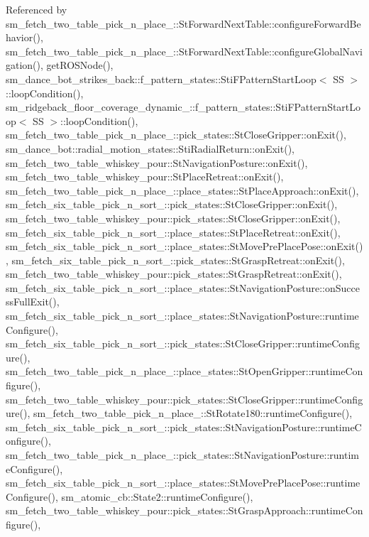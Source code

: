 Referenced by sm\+\_\+fetch\+\_\+two\+\_\+table\+\_\+pick\+\_\+n\+\_\+place\+\_\+::\+St\+Forward\+Next\+Table\+::configure\+Forward\+Behavior(), sm\+\_\+fetch\+\_\+two\+\_\+table\+\_\+pick\+\_\+n\+\_\+place\+\_\+::\+St\+Forward\+Next\+Table\+::configure\+Global\+Navigation(), get\+R\+O\+S\+Node(), sm\+\_\+dance\+\_\+bot\+\_\+strikes\+\_\+back\+::f\+\_\+pattern\+\_\+states\+::\+Sti\+F\+Pattern\+Start\+Loop$<$ S\+S $>$\+::loop\+Condition(), sm\+\_\+ridgeback\+\_\+floor\+\_\+coverage\+\_\+dynamic\+\_\+::f\+\_\+pattern\+\_\+states\+::\+Sti\+F\+Pattern\+Start\+Loop$<$ S\+S $>$\+::loop\+Condition(), sm\+\_\+fetch\+\_\+two\+\_\+table\+\_\+pick\+\_\+n\+\_\+place\+\_\+::pick\+\_\+states\+::\+St\+Close\+Gripper\+::on\+Exit(), sm\+\_\+dance\+\_\+bot\+::radial\+\_\+motion\+\_\+states\+::\+Sti\+Radial\+Return\+::on\+Exit(), sm\+\_\+fetch\+\_\+two\+\_\+table\+\_\+whiskey\+\_\+pour\+::\+St\+Navigation\+Posture\+::on\+Exit(), sm\+\_\+fetch\+\_\+two\+\_\+table\+\_\+whiskey\+\_\+pour\+::\+St\+Place\+Retreat\+::on\+Exit(), sm\+\_\+fetch\+\_\+two\+\_\+table\+\_\+pick\+\_\+n\+\_\+place\+\_\+::place\+\_\+states\+::\+St\+Place\+Approach\+::on\+Exit(), sm\+\_\+fetch\+\_\+six\+\_\+table\+\_\+pick\+\_\+n\+\_\+sort\+\_\+::pick\+\_\+states\+::\+St\+Close\+Gripper\+::on\+Exit(), sm\+\_\+fetch\+\_\+two\+\_\+table\+\_\+whiskey\+\_\+pour\+::pick\+\_\+states\+::\+St\+Close\+Gripper\+::on\+Exit(), sm\+\_\+fetch\+\_\+six\+\_\+table\+\_\+pick\+\_\+n\+\_\+sort\+\_\+::place\+\_\+states\+::\+St\+Place\+Retreat\+::on\+Exit(), sm\+\_\+fetch\+\_\+six\+\_\+table\+\_\+pick\+\_\+n\+\_\+sort\+\_\+::place\+\_\+states\+::\+St\+Move\+Pre\+Place\+Pose\+::on\+Exit(), sm\+\_\+fetch\+\_\+six\+\_\+table\+\_\+pick\+\_\+n\+\_\+sort\+\_\+::pick\+\_\+states\+::\+St\+Grasp\+Retreat\+::on\+Exit(), sm\+\_\+fetch\+\_\+two\+\_\+table\+\_\+whiskey\+\_\+pour\+::pick\+\_\+states\+::\+St\+Grasp\+Retreat\+::on\+Exit(), sm\+\_\+fetch\+\_\+six\+\_\+table\+\_\+pick\+\_\+n\+\_\+sort\+\_\+::place\+\_\+states\+::\+St\+Navigation\+Posture\+::on\+Success\+Full\+Exit(), sm\+\_\+fetch\+\_\+six\+\_\+table\+\_\+pick\+\_\+n\+\_\+sort\+\_\+::place\+\_\+states\+::\+St\+Navigation\+Posture\+::runtime\+Configure(), sm\+\_\+fetch\+\_\+six\+\_\+table\+\_\+pick\+\_\+n\+\_\+sort\+\_\+::pick\+\_\+states\+::\+St\+Close\+Gripper\+::runtime\+Configure(), sm\+\_\+fetch\+\_\+two\+\_\+table\+\_\+pick\+\_\+n\+\_\+place\+\_\+::place\+\_\+states\+::\+St\+Open\+Gripper\+::runtime\+Configure(), sm\+\_\+fetch\+\_\+two\+\_\+table\+\_\+whiskey\+\_\+pour\+::pick\+\_\+states\+::\+St\+Close\+Gripper\+::runtime\+Configure(), sm\+\_\+fetch\+\_\+two\+\_\+table\+\_\+pick\+\_\+n\+\_\+place\+\_\+::\+St\+Rotate180\+::runtime\+Configure(), sm\+\_\+fetch\+\_\+six\+\_\+table\+\_\+pick\+\_\+n\+\_\+sort\+\_\+::pick\+\_\+states\+::\+St\+Navigation\+Posture\+::runtime\+Configure(), sm\+\_\+fetch\+\_\+two\+\_\+table\+\_\+pick\+\_\+n\+\_\+place\+\_\+::pick\+\_\+states\+::\+St\+Navigation\+Posture\+::runtime\+Configure(), sm\+\_\+fetch\+\_\+six\+\_\+table\+\_\+pick\+\_\+n\+\_\+sort\+\_\+::place\+\_\+states\+::\+St\+Move\+Pre\+Place\+Pose\+::runtime\+Configure(), sm\+\_\+atomic\+\_\+cb\+::\+State2\+::runtime\+Configure(), sm\+\_\+fetch\+\_\+two\+\_\+table\+\_\+whiskey\+\_\+pour\+::pick\+\_\+states\+::\+St\+Grasp\+Approach\+::runtime\+Configure(), 